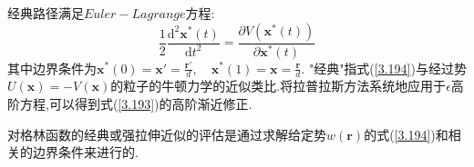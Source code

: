 经典路径满足$Euler-Lagrange$方程:
\begin{equation}
\frac{1}{2}\frac{\mathrm{d}^2 \mathbf{x}^*(t)}{\mathrm{d}t^2} = \frac{\partial V(\mathbf{x}^*(t))}{\partial \mathbf{x}^*(t)} \label{3.194}
\end{equation}
其中边界条件为$\mathbf{x}^*(0) = \mathbf{x}'= \frac{\mathbf{r}'}{d},\quad \mathbf{x}^*(1) = \mathbf{x} = \frac{\mathbf{r}}{d}$.
"经典"指式(\ref{3.194})与经过势$U(\mathbf{x})= -V(\mathbf{x})$的粒子的牛顿力学的近似类比.将拉普拉斯方法系统地应用于$\epsilon$高阶方程,可以得到式(\ref{3.193})的高阶渐近修正.

对格林函数的经典或强拉伸近似的评估是通过求解给定势$w(\mathbf{r})$的式(\ref{3.194})和相关的边界条件来进行的.





